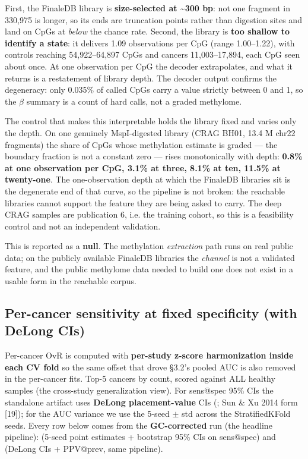 \documentclass[11pt]{article}
\begin{document}
First, the FinaleDB library is \textbf{size-selected at \textasciitilde{}300 bp}: not one fragment in 330,975 is longer, so its ends are truncation points rather than digestion sites and land on CpGs at \textit{below} the chance rate. Second, the library is \textbf{too shallow to identify a state}: it delivers 1.09 observations per CpG (range 1.00--1.22), with controls reaching 54,922--64,897 CpGs and cancers 11,003--17,894, each CpG seen about once. At one observation per CpG the decoder extrapolates, and what it returns is a restatement of library depth. The decoder output confirms the degeneracy: only 0.035\% of called CpGs carry a value strictly between 0 and 1, so the $\beta$ summary is a count of hard calls, not a graded methylome.

The control that makes this interpretable holds the library fixed and varies only the depth. On one genuinely MspI-digested library (CRAG BH01, 13.4 M chr22 fragments) the share of CpGs whose methylation estimate is graded --- the boundary fraction is not a constant zero --- rises monotonically with depth: \textbf{0.8\% at one observation per CpG, 3.1\% at three, 8.1\% at ten, 11.5\% at twenty-one}. The one-observation depth at which the FinaleDB libraries sit is the degenerate end of that curve, so the pipeline is not broken: the reachable libraries cannot support the feature they are being asked to carry. The deep CRAG samples are publication 6, i.e. the training cohort, so this is a feasibility control and not an independent validation.

This is reported as a \textbf{null}. The methylation \textit{extraction} path runs on real public data; on the publicly available FinaleDB libraries the \textit{channel} is not a validated feature, and the public methylome data needed to build one does not exist in a usable form in the reachable corpus.

\subsection{Per-cancer sensitivity at fixed specificity (with DeLong CIs)}
Per-cancer OvR is computed with \textbf{per-study z-score harmonization inside each CV fold} so the same offset that drove \S{}3.2's pooled AUC is also removed in the per-cancer fits. Top-5 cancers by count, scored against ALL healthy samples (the cross-study generalization view). For sens@spec 95\% CIs the standalone artifact uses \textbf{DeLong placement-value} CIs (; Sun \& Xu 2014 form [19]); for the AUC variance we use the 5-seed $\pm$ std across the StratifiedKFold seeds. Every row below comes from the \textbf{GC-corrected} run (the headline pipeline):  (5-seed point estimates + bootstrap 95\% CIs on sens@spec) and  (DeLong CIs + PPV@prev, same pipeline).
\end{document}
